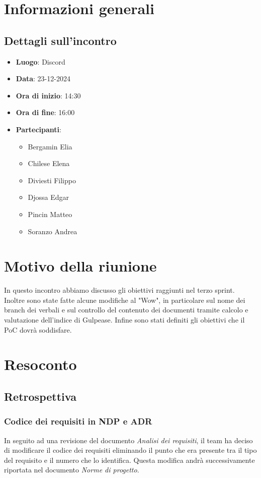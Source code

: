 \section{Informazioni generali}
\subsection{Dettagli sull'incontro}
\begin{itemize}
    \item \textbf{Luogo}: Discord
    \item \textbf{Data}: 23-12-2024
    \item \textbf{Ora di inizio}: 14:30
    \item \textbf{Ora di fine}: 16:00
    \item \textbf{Partecipanti}:
    \begin{itemize}
        \item Bergamin Elia
        \item Chilese Elena
        \item Diviesti Filippo
        \item Djossa Edgar
        \item Pincin Matteo 
        \item Soranzo Andrea  
    \end{itemize}
\end{itemize}

\section{Motivo della riunione}
In questo incontro abbiamo discusso gli obiettivi raggiunti nel terzo sprint. Inoltre sono state fatte alcune modifiche
al "Wow", in particolare sul nome dei branch dei verbali e sul controllo del contenuto dei documenti tramite calcolo e valutazione dell'indice di Gulpease.
Infine sono stati definiti gli obiettivi che il PoC dovrà soddisfare.

\section{Resoconto}
\subsection{Retrospettiva}

\subsubsection{Codice dei requisiti in NDP e ADR}
In seguito ad una revisione del documento \textit{Analisi dei requisiti}, il team ha deciso di modificare il codice dei requisiti eliminando il punto che era presente tra il tipo del requisito e il numero che lo identifica.
Questa modifica andrà successivamente riportata nel documento \textit{Norme di progetto}.

